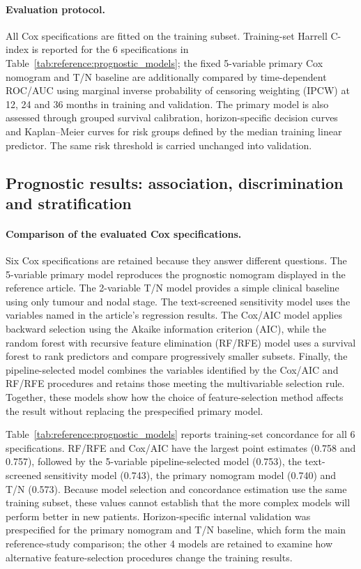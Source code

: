 \paragraph{Evaluation protocol.}
All Cox specifications are fitted on the training subset. Training-set Harrell
C-index is reported for the 6 specifications in
Table~\ref{tab:reference:prognostic_models}; the fixed 5-variable primary Cox
nomogram and T/N baseline are additionally compared by time-dependent ROC/AUC using marginal
inverse probability of censoring weighting (IPCW) at 12, 24 and 36 months in
training and validation. The primary model is also assessed through grouped
survival calibration, horizon-specific decision curves and Kaplan--Meier curves
for risk groups defined by the median training linear predictor. The same risk
threshold is carried unchanged into validation.

\subsection{Prognostic results: association, discrimination and stratification}
\label{sec:reference:prognostic_results}

\paragraph{Comparison of the evaluated Cox specifications.}
Six Cox specifications are retained because they answer different questions. The
5-variable primary model reproduces the prognostic nomogram displayed in the
reference article. The 2-variable T/N model provides a simple clinical baseline
using only tumour and nodal stage. The text-screened sensitivity model uses the
variables named in the article's regression results. The Cox/AIC model applies
backward selection using the Akaike information criterion (AIC), while the random
forest with recursive feature elimination (RF/RFE) model uses a survival forest to
rank predictors and compare progressively smaller subsets. Finally, the
pipeline-selected model combines the variables identified by the Cox/AIC and
RF/RFE procedures and retains those meeting the multivariable selection rule.
Together, these models show how the choice of feature-selection method affects the
result without replacing the prespecified primary model.

Table~\ref{tab:reference:prognostic_models} reports training-set concordance for
all 6 specifications. RF/RFE and Cox/AIC have the largest point estimates (0.758
and 0.757), followed by the 5-variable pipeline-selected model (0.753), the
text-screened sensitivity model (0.743), the primary nomogram model (0.740) and
T/N (0.573). Because model selection and concordance estimation use the same
training subset, these values cannot establish that the more complex models will
perform better in new patients. Horizon-specific internal validation was
prespecified for the primary nomogram and T/N baseline, which form the main
reference-study comparison; the other 4 models are retained to examine how
alternative feature-selection procedures change the training results.

